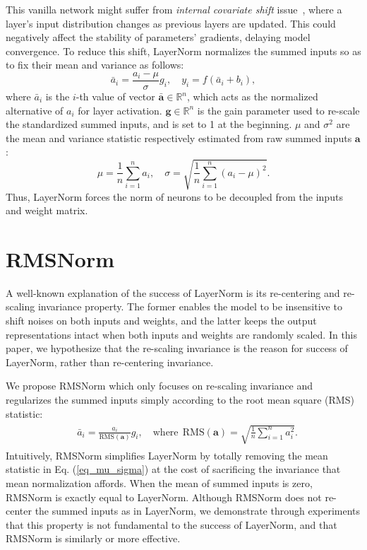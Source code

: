 \documentclass{article}
\begin{document}
This vanilla network might suffer from \textit{internal covariate shift} issue~\cite{Ioffe:2015:BNA:3045118.3045167}, where a layer's input distribution changes as previous layers are updated. This could negatively affect the stability of parameters' gradients, delaying model convergence. To reduce this shift, LayerNorm normalizes the summed inputs so as to fix their mean and variance as follows:
\begin{equation}
    \bar{a}_i = \frac{a_i - \mu}{\sigma} g_i, \quad y_i = f\left(\bar{a}_i + b_i\right),
\end{equation}
where $\bar{a}_i$ is the $i$-th value of vector $\mathbf{\bar{a}} \in \mathbb{R}^n$, which acts as the normalized alternative of $a_i$ for layer activation. $\mathbf{g}\in\mathbb{R}^{n}$ is the gain parameter used to re-scale the standardized summed inputs, and is set to 1 at the beginning. $\mu$ and $\sigma^2$ are the mean and variance statistic respectively estimated from raw summed inputs $\mathbf{a}$:
\begin{equation}\label{eq_mu_sigma}
    \mu = \frac{1}{n}\sum_{i=1}^{n} a_i, \quad \sigma = \sqrt{\frac{1}{n}\sum_{i=1}^{n}(a_i - \mu)^2}.
\end{equation}
Thus, LayerNorm forces the norm of neurons to be decoupled from the inputs and weight matrix. 

\section{RMSNorm}

A well-known explanation of the success of LayerNorm is its re-centering and re-scaling invariance property. The former enables the model to be insensitive to shift noises on both inputs and weights, and the latter keeps the output representations intact when both inputs and weights are randomly scaled.
In this paper, we hypothesize that the re-scaling invariance is the reason for success of LayerNorm, rather than re-centering invariance.

We propose RMSNorm which only focuses on re-scaling invariance and regularizes the summed inputs simply according to the root mean square (RMS) statistic:
\begin{align}\label{eq_rmsnorm}
    \begin{split}
        & \bar{a}_i = \frac{a_i}{\text{RMS}(\mathbf{a})} g_i, \quad \text{where}~~ \text{RMS}(\mathbf{a}) = \sqrt{\frac{1}{n} \sum_{i=1}^{n} a_i^2}.
    \end{split}
\end{align}
Intuitively, RMSNorm simplifies LayerNorm by totally removing the mean statistic in Eq. (\ref{eq_mu_sigma}) at the cost of sacrificing the invariance that mean normalization affords. When the mean of summed inputs is zero, RMSNorm is exactly equal to LayerNorm. Although RMSNorm does not re-center the summed inputs as in LayerNorm, we demonstrate through experiments that this property is not fundamental to the success of LayerNorm, and that RMSNorm is similarly or more effective.
\end{document}
